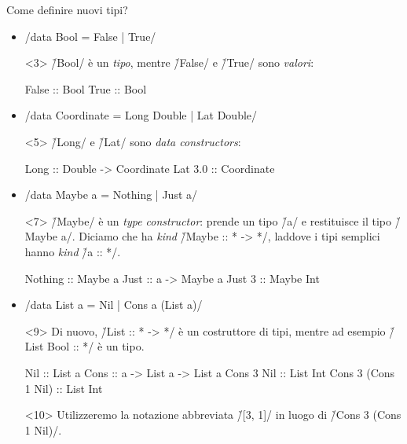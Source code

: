 \begin{frame}[fragile]{\secname}{Come definire nuovi tipi?}
\begin{overlayarea}{\textwidth}{0.7\textheight}
\begin{itemize}
\item<2-> \haskell/data Bool = False | True/

\begin{onlyenv}<3>
\vspace{0.2cm}
\h/Bool/ è un \emph{tipo}, mentre \h/False/ e \h/True/ sono \emph{valori}:

\begin{haskellcode}
False :: Bool
True  :: Bool
\end{haskellcode}
\end{onlyenv}

\item<4-> \haskell/data Coordinate = Long Double | Lat Double/
\begin{onlyenv}<5>
\h/Long/ e \h/Lat/ sono \emph{data constructors}:

\begin{haskellcode}
Long    :: Double -> Coordinate
Lat 3.0 :: Coordinate
\end{haskellcode}
\end{onlyenv}
\item<6-> \haskell/data Maybe a = Nothing | Just a/
\begin{onlyenv}<7>
\h/Maybe/ è un \emph{type constructor}: prende un tipo \h/a/ e restituisce il tipo \h/Maybe a/. Diciamo che ha \emph{kind} \h/Maybe :: * -> */, laddove i tipi semplici hanno \emph{kind} \h/a :: */.

\begin{haskellcode}
Nothing :: Maybe a
Just    :: a -> Maybe a
Just 3  :: Maybe Int
\end{haskellcode}
\end{onlyenv}
\item<8-> \haskell/data List a = Nil | Cons a (List a)/
\begin{onlyenv}<9>
Di nuovo, \h/List :: * -> */ è un costruttore di tipi, mentre ad esempio \h/List Bool :: */ è un tipo.

\begin{haskellcode}
Nil :: List a
Cons :: a -> List a -> List a
Cons 3 Nil :: List Int
Cons 3 (Cons 1 Nil) :: List Int
\end{haskellcode}
\end{onlyenv}
\begin{onlyenv}<10>
Utilizzeremo la notazione abbreviata \h/[3, 1]/ in luogo di \h/Cons 3 (Cons 1 Nil)/.
\end{onlyenv}
\end{itemize}
\end{overlayarea}

\end{frame}

